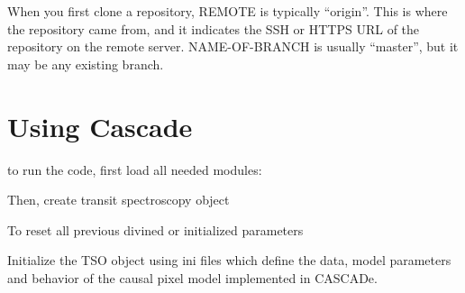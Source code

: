 \documentclass[a4paper,11pt,english]{sphinxmanual}
\begin{document}
When you first clone a repository, REMOTE is typically “origin”. This is where the repository came from, and it indicates the SSH or HTTPS URL of the repository on the remote server. NAME-OF-BRANCH is usually “master”, but it may be any existing branch.


\section{Using Cascade}
\label{\detokenize{howto:using-cascade}}\label{\detokenize{howto::doc}}
to run the code, first load all needed modules:

%
\begin{sphinxVerbatim}[commandchars=\\\{\}]
 
\end{sphinxVerbatim}

Then, create transit spectroscopy object

%
\begin{sphinxVerbatim}[commandchars=\\\{\}]
  
\end{sphinxVerbatim}

To reset all previous divined or initialized parameters

%
\begin{sphinxVerbatim}[commandchars=\\\{\}]
\end{sphinxVerbatim}

Initialize the TSO object using ini files which define the data, model parameters and behavior of the causal pixel model implemented in CASCADe.

%
\begin{sphinxVerbatim}[commandchars=\\\{\}]
  
   
                            
\end{sphinxVerbatim}
\end{document}

